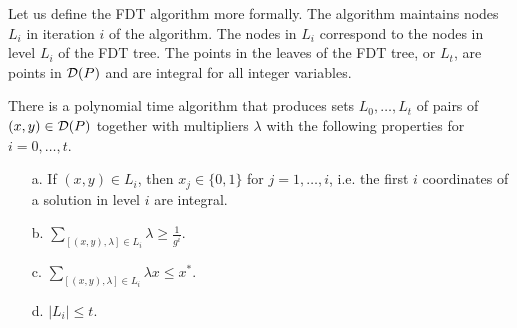 \documentclass[runningheads]{llncs}
\begin{document}
Let us define the FDT algorithm more formally. The algorithm maintains nodes $L_i$ in iteration $i$ of the algorithm. The nodes in $L_i$ correspond to the nodes in level $L_i$ of the FDT tree. The points in the leaves of the FDT tree, or $L_t$, are points in $\operatorname{\mathcal{D}}(P)$ and are integral for all integer variables.



\begin{lemma}\label{prune}
	There is a polynomial time algorithm that produces sets $L_0,\ldots,L_t$ of pairs of $(x,y)\in \operatorname{\mathcal{D}}(P)$ together with multipliers $\lambda$ with the following properties for $i=0,\ldots,t$. 
	\begin{itemize}
		\item[a.] If $(x,y)\in L_i$, then $x_j \in \{0,1\}$ for $j=1,\ldots,i$, i.e. the first $i$ coordinates of a solution in level $i$ are integral. 
		\item[b.] $\sum_{[(x,y),\lambda]\in L_i} \lambda\geq\frac{1}{g^i}$.
		\item[c.] $\sum_{[(x,y),\lambda]\in L_i}\lambda x \leq x^*$.
		\item[d.] $|L_i|\leq t$.
	\end{itemize}
\end{lemma}
\end{document}
